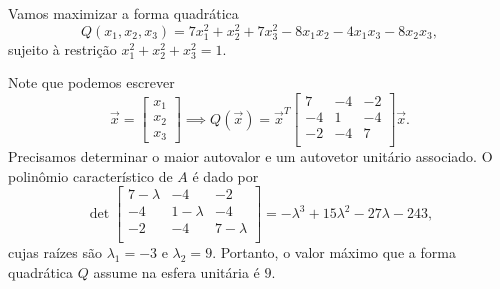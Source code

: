 \documentclass[../livro.tex]{subfiles}
\begin{document}
\begin{example}\label{otimiz}
	Vamos maximizar a forma quadrática 
	\[
	Q(x_1, x_2, x_3) = 7 x_1^2 + x_2^2 + 7x_3^2 - 8 x_1x_2 - 4x_1x_3 - 8 x_2x_3,
	\] sujeito à restrição $x_1^2 + x_2^2 + x_3^2 = 1$.
	
	Note que podemos escrever
	\[
	\vec{x} = 
	\begin{bmatrix}
	x_1 \\ x_2 \\ x_3
	\end{bmatrix} \implies 
	Q(\vec{x}) = \vec{x}^T 
	\begin{bmatrix}
	7 & -4 & -2 \\
	-4 &  1 & -4 \\
	-2 & -4 &  7 \\
	\end{bmatrix}\vec{x}.
	\] Precisamos determinar o maior autovalor e um autovetor unitário associado. O polinômio característico de $A$ é dado por 
	\[
	\det 
	\begin{bmatrix}
	7 - \lambda & -4 & -2 \\
	-4 &  1 - \lambda & -4 \\
	-2 & -4 &  7 - \lambda \\
	\end{bmatrix} = - \lambda^3 + 15 \lambda^2 - 27 \lambda - 243,
	\] cujas raízes são $\lambda_1 = -3$ e $\lambda_2 = 9$. Portanto, o valor máximo que a forma quadrática $Q$ assume na esfera unitária é $9$.
	

\end{example}
\end{document}
